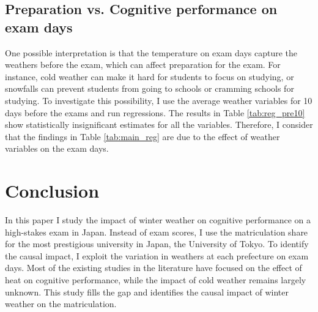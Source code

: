 \documentclass[12pt,letterpaper]{article}
\begin{document}
\subsection{Preparation vs. Cognitive performance on exam days}

One possible interpretation is that the temperature on exam days capture the weathers before the exam, which can affect preparation for the exam. 
For instance, cold weather can make it hard for students to focus on studying, or snowfalls can prevent students from going to schools or cramming schools for studying.
To investigate this possibility, I use the average weather variables for 10 days before the exams and run regressions.
The results in Table \ref{tab:reg_pre10} show statistically insignificant estimates for all the variables.
Therefore, I consider that the findings in Table \ref{tab:main_reg} are due to the effect of weather variables on the exam days.

%  

\section{Conclusion}\label{sec:conclusion}

In this paper I study the impact of winter weather on cognitive performance on a high-stakes exam in Japan.
Instead of exam scores, I use the matriculation share for the most prestigious university in Japan, the University of Tokyo.
To identify the causal impact, I exploit the variation in weathers at each prefecture on exam days.
Most of the existing studies in the literature have focused on the effect of heat on cognitive performance, while the impact of cold weather remains largely unknown.
This study fills the gap and identifies the causal impact of winter weather on the matriculation.
\end{document}
